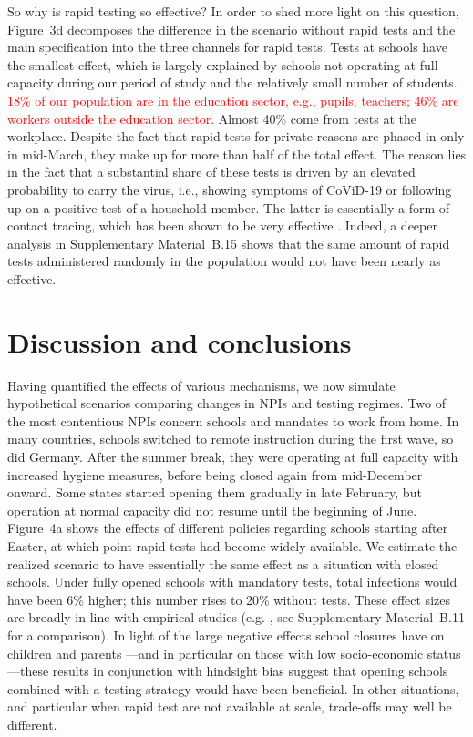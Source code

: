 \documentclass[fleqn,10pt]{wlscirep}
\begin{document}
So why is rapid testing so effective? In order to shed more light on this question,
Figure~3d decomposes the difference in the scenario without rapid tests and the main
specification into the three channels for rapid tests. Tests at schools have the
smallest effect, which is largely explained by schools not operating at full capacity
during our period of study and the relatively small number of students.
\textcolor{red}{18\% of our population are in the education sector, e.g., pupils,
teachers; 46\% are workers outside the education sector.} Almost 40\% come from tests at
the workplace. Despite the fact that rapid tests for private reasons are phased in only
in mid-March, they make up for more than half of the total effect. The reason lies in
the fact that a substantial share of these tests is driven by an elevated probability to
carry the virus, i.e., showing symptoms of CoViD-19 or following up on a positive test
of a household member. The latter is essentially a form of contact tracing, which has
been shown to be very effective \cite{Contreras2021, Fetzer2021,Kretzschmar2020}.
Indeed, a deeper analysis in Supplementary Material~B.15 shows that the same amount of
rapid tests administered randomly in the population would not have been nearly as
effective.

\section*{Discussion and conclusions}

Having quantified the effects of various mechanisms, we now simulate hypothetical
scenarios comparing changes in NPIs and testing regimes. Two of the most contentious
NPIs concern schools and mandates to work from home. In many countries, schools switched
to remote instruction during the first wave, so did Germany. After the summer break,
they were operating at full capacity with increased hygiene measures, before being
closed again from mid-December onward. Some states started opening them gradually in
late February, but operation at normal capacity did not resume until the beginning of
June. Figure~4a shows the effects of different policies regarding schools starting after
Easter, at which point rapid tests had become widely available. We estimate the realized
scenario to have essentially the same effect as a situation with closed schools. Under
fully opened schools with mandatory tests, total infections would have been 6\% higher;
this number rises to 20\% without tests. These effect sizes are broadly in line with
empirical studies (e.g. \cite{Vlachos2021, Berger2021}, see Supplementary Material~B.11
for a comparison). In light of the large negative effects school closures have on
children and parents \cite{Luijten2021, Melegari2021}---and in particular on those with
low socio-economic status---these results in conjunction with hindsight bias suggest
that opening schools combined with a testing strategy would have been beneficial. In
other situations, and particular when rapid test are not available at scale, trade-offs
may well be different.
\end{document}
